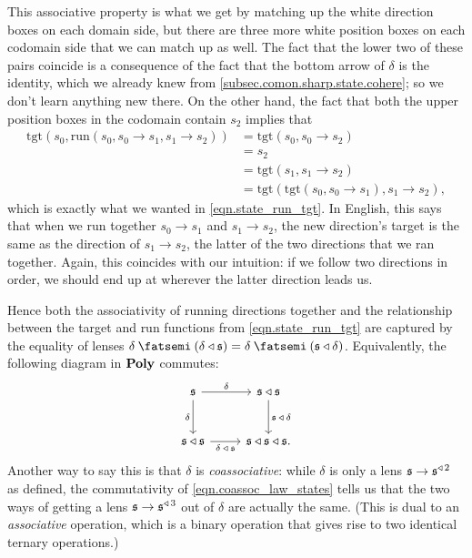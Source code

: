 \documentclass[Book-Poly]{subfiles}
\begin{document}
This associative property is what we get by matching up the white direction boxes on each domain side, but there are three more white position boxes on each codomain side that we can match up as well.
The fact that the lower two of these pairs coincide is a consequence of the fact that the bottom arrow of $\delta$ is the identity, which we already knew from \cref{subsec.comon.sharp.state.cohere}; so we don't learn anything new there.
On the other hand, the fact that both the upper position boxes in the codomain contain $s_2$ implies that
\begin{align*}
    \text{tgt}(s_0,\text{run}(s_0,s_0\to s_1,s_1\to s_2))&=\text{tgt}(s_0,s_0\to s_2)\\
    &=s_2\\
    &=\text{tgt}(s_1,s_1\to s_2)\\
    &=\text{tgt}(\text{tgt}(s_0,s_0\to s_1),s_1\to s_2),
\end{align*}
which is exactly what we wanted in \eqref{eqn.state_run_tgt}.
In English, this says that when we run together $s_0\to s_1$ and $s_1\to s_2$, the new direction's target is the same as the direction of $s_1\to s_2$, the latter of the two directions that we ran together.
Again, this coincides with our intuition: if we follow two directions in order, we should end up at wherever the latter direction leads us.

Hence both the associativity of running directions together and the relationship between the target and run functions from \eqref{eqn.state_run_tgt} are captured by the equality of lenses $\delta\then(\delta\tri\ema{s})=\delta\then(\ema{s}\tri\delta)$.
Equivalently, the following diagram in $\mathbf{Poly}$ commutes:
\begin{equation}\label{eqn.coassoc_law_states}
\begin{tikzcd}[row sep=large]
	\ema{s}\ar[r, "\delta"]\ar[d, "\delta"']&
	\ema{s}\tri\ema{s}\ar[d, "\ema{s}\:\tri\:\delta"]\\
	\ema{s}\tri\ema{s}\ar[r, "\delta\:\tri\:\ema{s}"']&
	\ema{s}\tri\ema{s}\tri\ema{s}.
\end{tikzcd}
\end{equation}
Another way to say this is that $\delta$ is \emph{coassociative}: while $\delta$ is only a lens $\mathfrak{s}\to\mathfrak{s}^{\mathbin{\triangleleft}\,2}$ as defined, the commutativity of \eqref{eqn.coassoc_law_states} tells us that the two ways of getting a lens $\mathfrak{s}\to\mathfrak{s}^{\mathbin{\triangleleft}\,3}$ out of $\delta$ are actually the same.
(This is dual to an \emph{associative} operation, which is a binary operation that gives rise to two identical ternary operations.)
\end{document}
